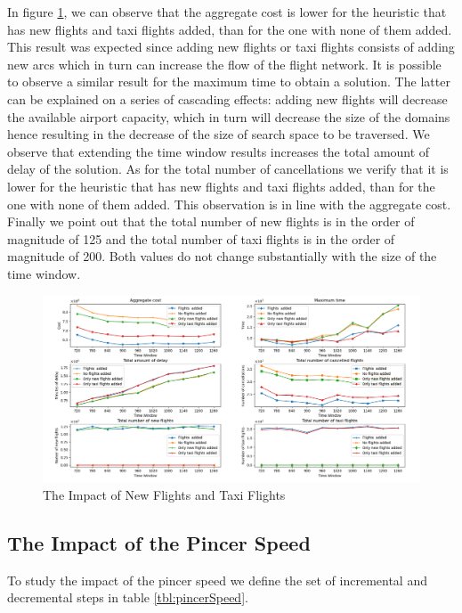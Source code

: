In  figure \ref{fig:flightNoFlight}, we can observe that the aggregate cost is lower for the heuristic that has new flights and taxi flights added, than for the one with none of them added. This result was expected since adding new flights or taxi flights consists of adding new arcs which in turn can increase the flow of the flight network. It is possible to observe a similar result for the maximum time to obtain a solution. The latter can be explained on a series of cascading effects: adding new flights will decrease the available airport capacity, which in turn will decrease the size of the domains hence resulting in the decrease of the size of search space to be traversed. We  observe that extending the time window results increases the total amount of delay of the solution. As for the total number of cancellations we verify that it is lower for the heuristic that has new flights and taxi flights added, than for the one with none of them added. This observation is in line with the aggregate cost. Finally we point out that the total number of new flights is in the order of magnitude of 125 and the total number of taxi flights is in the order of magnitude of 200. Both values do not change substantially with the size of the time window.

	\begin{figure}[h!]
		\centering
		\includegraphics[width=\textwidth]{figures/flightNoFlight2x3_1.png}
		\caption[]{The Impact of New Flights and Taxi Flights}
		\label{fig:flightNoFlight}
	\end{figure}


\subsection{The Impact of the Pincer Speed}\label{sec:pincerSpeed}
To study the impact of the pincer speed we define the set of incremental and decremental steps in table \ref{tbl:pincerSpeed}.

